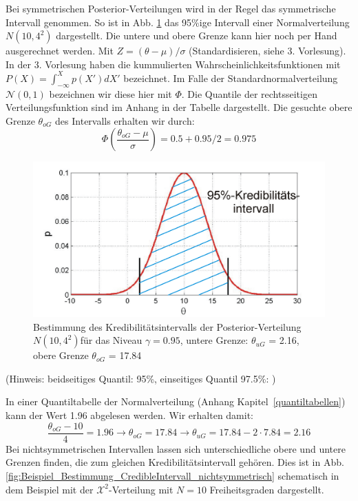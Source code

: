Bei symmetrischen Posterior-Verteilungen wird in der Regel
das symmetrische Intervall genommen. So ist in Abb. \ref{fig:Beispiel_Bestimmung_CredibleIntervall}  das 95\%ige Intervall
einer Normalverteilung $N(10,4^2)$ dargestellt.
Die untere und obere Grenze kann hier noch per Hand ausgerechnet werden.
Mit $Z=(\theta - \mu)/ \sigma$ (Standardisieren, siehe 3. Vorlesung).
In der 3. Vorlesung haben die kummulierten Wahrscheinlichkeitsfunktionen mit $P(X) = \int_{-\infty}^{X} p(X') dX'$ bezeichnet. Im Falle der
Standardnormalverteilung $\mathcal{N}(0,1)$ bezeichnen wir diese hier mit $\Phi$. Die Quantile der rechtsseitigen Verteilungsfunktion sind im Anhang in der Tabelle dargestellt. Die gesuchte obere Grenze $\theta_{oG}$ des Intervalls erhalten wir durch:
\[
\Phi\left(\frac{\theta_{oG}-\mu}{\sigma}\right) = 0.5 + 0.95/2 = 0.975
\]
\begin{figure}[!htb]
	\begin{center}
		\includegraphics[width=120mm]
		{12_vorlesung_GUMS2/media/Posterior_Vertrauensintervall_all.png}
		\caption{Bestimmung des Kredibilitätsintervalls der Posterior-Verteilung $N(10,4^2)$für das Niveau
			$\gamma = 0.95 $, untere Grenze: $\theta_{uG}$ = 2.16,
	    	obere Grenze $\theta_{oG}$ = 17.84}
    	\label{fig:Beispiel_Bestimmung_CredibleIntervall}
	\end{center}
\end{figure}
(Hinweis: beidseitiges Quantil: 95\%, einseitiges Quantil 97.5\%: )

In einer Quantiltabelle der Normalverteilung (Anhang Kapitel~\ref{quantiltabellen}) kann der Wert 1.96 abgelesen werden.
Wir erhalten damit:
\[
\frac{\theta_{oG}-10}{4} = 1.96 \rightarrow \theta_{oG} = 17.84
\rightarrow \theta_{uG} = 17.84 - 2 \cdot 7.84 = 2.16
\]
Bei nichtsymmetrischen Intervallen lassen sich unterschiedliche obere und untere Grenzen finden, die zum gleichen Kredibilitätsintervall gehören. Dies ist in
Abb. \ref{fig:Beispiel_Bestimmung_CredibleIntervall_nichtsymmetrisch}
schematisch in dem Beispiel mit der $\mathcal{X}^2$-Verteilung mit $N=10$ Freiheitsgraden dargestellt.

